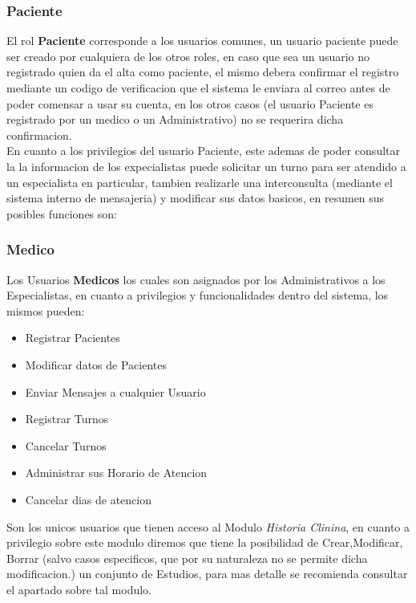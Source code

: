 \subsubsection{Paciente}

El rol \textbf{Paciente} corresponde a los usuarios comunes, un usuario paciente puede 
ser creado por cualquiera de los otros roles, en caso que sea un usuario no registrado
quien da el alta como paciente, el mismo debera confirmar el registro mediante un
codigo de verificacion que el sistema le enviara al correo antes de poder comensar
a usar su cuenta, en los otros casos (el usuario Paciente es registrado por un 
medico o un Administrativo) no se requerira dicha confirmacion.\\[0.1cm]

En cuanto a los privilegios del usuario Paciente, este ademas de poder consultar la 
la informacion de los expecialistas puede solicitar un turno para ser atendido 
a un especialista en particular, tambien realizarle una interconsulta (mediante
el sistema interno de mensajeria) y modificar sus datos basicos, en resumen sus 
posibles funciones son:


\subsubsection{Medico}

Los Usuarios \textbf{Medicos} los cuales son asignados por los Administrativos a 
los Especialistas, en cuanto a privilegios y funcionalidades dentro del sistema, 
los mismos pueden:

\begin{itemize}
    \item Registrar Pacientes
    \item Modificar datos de Pacientes
    \item Enviar Mensajes a cualquier Usuario
    \item Registrar Turnos 
    \item Cancelar Turnos
    \item Administrar sus Horario de Atencion
    \item Cancelar dias de atencion
\end{itemize}

Son los unicos usuarios que tienen acceso al Modulo \textit{Historia Clinina}, en cuanto
a privilegio sobre este modulo diremos que tiene la posibilidad de Crear,Modificar,
Borrar (salvo casos especificos, que por su naturaleza no se permite dicha 
modificacion.) un conjunto de Estudios, para mas detalle se recomienda consultar
el apartado sobre tal modulo.

